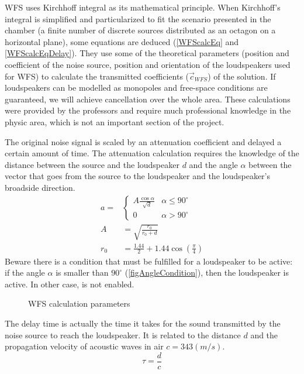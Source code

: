 WFS uses Kirchhoff integral as its mathematical principle. When Kirchhoff's integral is simplified and particularized to fit the scenario presented in the chamber (a finite number of discrete sources distributed as an octagon on a horizontal plane), some equations are deduced (\autoref{WFScalcEq} and \autoref{WFScalcEqDelay}). They use some of the theoretical parameters (position and coefficient of the noise source, position and orientation of the loudspeakers used for WFS) to calculate the transmitted coefficients ($\vec{c}_\mathit{WFS}$) of the solution. If loudspeakers can be modelled as monopoles and free-space conditions are guaranteed, we will achieve cancellation over the whole area. These calculations were provided by the professors and require much professional knowledge in the physic area, which is not an important section of the project.

The original noise signal is scaled by an attenuation coefficient and delayed a certain amount of time. The attenuation calculation requires the knowledge of the distance between the source and the loudspeaker $d$ and the angle $\alpha$ between the vector that goes from the source to the loudspeaker and the loudspeaker's broadside direction.
\begin{equation}
	\begin{aligned}
		a = 
		&\begin{cases}
		A\frac{\cos\alpha}{\sqrt{d}} & \alpha \leq 90^\circ \\
		0 & \alpha > 90^\circ
		\end{cases}
		\\
		A &= \sqrt{\frac{r_0}{r_0 + d}}\\
		r_0 &= \frac{1.44}{2} + 1.44 \cos\left( \frac{\pi}{4} \right)
	\end{aligned}
	\label{WFScalcEq}
\end{equation}
Beware there is a condition that must be fulfilled for a loudspeaker to be active: if the angle $\alpha$ is smaller than $90^\circ$ (\autoref{figAngleCondition}), then the loudspeaker is active. In other case, is not enabled.

%	
\begin{figure}
	\centering
	\def\svgwidth{0.4\columnwidth}
	\graphicspath{{Img/}}
	
	\caption[WFS calculation parameters]{WFS calculation parameters}
	\label{figAngleCondition}
\end{figure}

The delay time is actually the time it takes for the sound transmitted by the noise source to reach the loudspeaker. It is related to the distance $d$ and the propagation velocity of acoustic waves in air $c = 343 (m/s)$.
\begin{equation}
	\tau = \frac{d}{c} \label{WFScalcEqDelay}
\end{equation}

